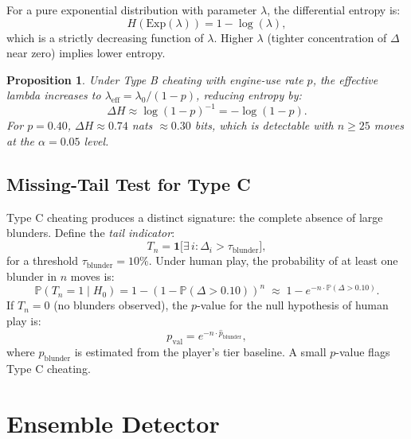\documentclass[11pt,a4paper]{article}
\newtheorem{proposition}{Proposition}
\newcommand{\Prob}{\mathbb{P}}
\begin{document}
For a pure exponential distribution with parameter $\lambda$, the
differential entropy is:
\begin{equation}
  H(\mathrm{Exp}(\lambda)) = 1 - \log(\lambda),
  \label{eq:exp_entropy}
\end{equation}
which is a strictly decreasing function of $\lambda$. Higher $\lambda$
(tighter concentration of $\Delta$ near zero) implies lower entropy.

\begin{proposition}
\label{prop:entropy_gap}
Under Type B cheating with engine-use rate $p$, the effective lambda
increases to $\lambda_{\mathrm{eff}} = \lambda_0 / (1-p)$, reducing entropy by:
\begin{equation}
  \Delta H \approx \log(1-p)^{-1} = -\log(1-p).
  \label{eq:entropy_gap}
\end{equation}
For $p = 0.40$, $\Delta H \approx 0.74$ nats $\approx 0.30$ bits,
which is detectable with $n \geq 25$ moves at the $\alpha = 0.05$ level.
\end{proposition}

\subsection{Missing-Tail Test for Type C}

Type C cheating produces a distinct signature: the complete absence of
large blunders. Define the \emph{tail indicator}:
\begin{equation}
  T_n = \mathbf{1}\bigl[\exists\, i : \Delta_i > \tau_{\mathrm{blunder}}\bigr],
\end{equation}
for a threshold $\tau_{\mathrm{blunder}} = 10\%$. Under human play,
the probability of at least one blunder in $n$ moves is:
\begin{equation}
  \Prob(T_n = 1 \mid H_0) = 1 - (1 - \Prob(\Delta > 0.10))^n
  \;\approx\; 1 - e^{-n \cdot \Prob(\Delta > 0.10)}.
\end{equation}
If $T_n = 0$ (no blunders observed), the $p$-value for the null hypothesis
of human play is:
\begin{equation}
  p_{\mathrm{val}} = e^{-n \cdot \hat{p}_{\mathrm{blunder}}},
  \label{eq:tail_pval}
\end{equation}
where $\hat{p}_{\mathrm{blunder}}$ is estimated from the player's tier
baseline. A small $p$-value flags Type C cheating.

\section{Ensemble Detector}
\label{sec:ensemble}
\end{document}
